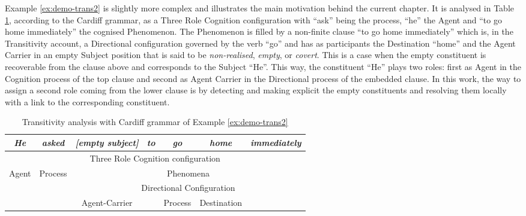     Example \ref{ex:demo-trans2} is slightly more complex and illustrates the main motivation behind the current chapter. It is analysed in Table \ref{tab:demo-trans2}, according to the Cardiff grammar, as a Three Role Cognition configuration with ``ask'' being the process, ``he'' the Agent and ``to go home immediately'' the cognised Phenomenon. The Phenomenon is filled by a non-finite clause ``to go home immediately'' which is, in the Transitivity account, a Directional configuration governed by the verb ``go'' and has as participants the Destination ``home'' and the Agent Carrier in an empty Subject position that is said to be \textit{non-realised}, \textit{empty}, or \textit{covert}. This is a case when the empty constituent is recoverable from the clause above and corresponds to the Subject ``He''. This way, the constituent ``He'' plays two roles: first as Agent in the Cognition process of the top clause and second as Agent Carrier in the Directional process of the embedded clause. In this work, the way to assign a second role coming from the lower clause is by detecting and making explicit the empty constituents and resolving them locally with a link to the corresponding constituent.

    
    \begin{table}[!ht]
        \centering
        \begin{tabular}{cc|c|c|c|c|c}
            \hline
            \multicolumn{1}{|c|}{\textit{He}} & \textit{asked} & \textit{{[}empty subject{]}} & \textit{to} & \textit{go} & \textit{home} & \multicolumn{1}{c|}{\textit{immediately}} \\ \hline
            \multicolumn{7}{|c|}{Three Role Cognition configuration}                                                                                                                      \\ \hline
            \multicolumn{1}{|c|}{Agent}           & Process        & \multicolumn{5}{c|}{Phenomena}                                                                                       \\ \hline
            &                & \multicolumn{5}{c|}{Directional Configuration}                                                                       \\ \cline{3-7} 
            &                & Agent-Carrier                &             & Process     & Destination   &                                           \\ \cline{3-3} \cline{5-6}
        \end{tabular}
        \caption{Transitivity analysis with Cardiff grammar of Example \ref{ex:demo-trans2}}
        \label{tab:demo-trans2}
    \end{table}

